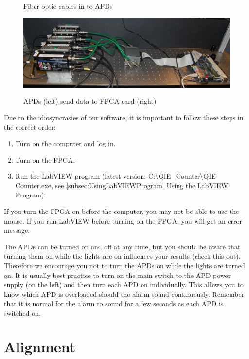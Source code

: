 \documentclass{../lab}
\begin{document}
\begin{figure}[H]
  \caption{Fiber optic cables in to APDs}
  \label{fig:QIE3.jpg}
\endminipage\hfill
{}
  \href{http://experimentationlab.berkeley.edu/sites/default/files/images/QIE2.jpg}{\includegraphics[width=\linewidth,keepaspectratio]{images/QIE2.jpg}}
  \caption{APDs (left) send data to FPGA card (right)}
  \label{fig:QIE2.jpg}
\endminipage
\end{figure}


\noindent Due to the idiosyncrasies of our software, it is important to follow these steps in the correct order:

\begin{enumerate}
    \item Turn on the computer and log in.

    \item Turn on the FPGA.

    \item Run the LabVIEW program (latest version: C:\textbackslash QIE\_Counter\textbackslash QIE Counter.exe, see \ref{subsec:UsingLabVIEWProgram} Using the LabVIEW Program).
\end{enumerate}

If you turn the FPGA on before the computer, you may not be able to use the mouse. If you run LabVIEW before turning on the FPGA, you will get an error message.

The APDs can be turned on and off at any time, but you should be aware that turning them on while the lights are on influences your results (check this out). Therefore we encourage you not to turn the APDs on while the lights are turned on. It is usually best practice to turn on the main switch to the APD power supply (on the left) and then turn each APD on individually. This allows you to know which APD is overloaded should the alarm sound continuously. Remember that it is normal for the alarm to sound for a few seconds as each APD is switched on.

\section{Alignment}
\label{sec:Alignment}
\end{document}
